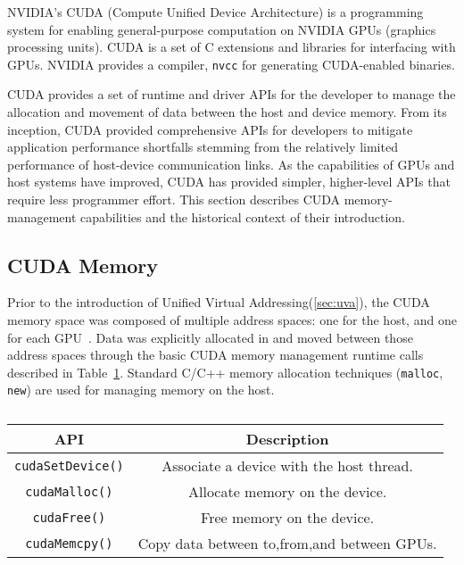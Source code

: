 NVIDIA's CUDA (Compute Unified Device Architecture) is a programming system for enabling general-purpose computation on NVIDIA GPUs (graphics processing units).
CUDA is a set of C extensions and libraries for interfacing with GPUs.
NVIDIA provides a compiler, \texttt{nvcc} for generating CUDA-enabled binaries.

CUDA provides a set of runtime and driver APIs for the developer to manage the allocation and movement of data between the host and device memory.
From its inception, CUDA provided comprehensive APIs for developers to mitigate application performance shortfalls stemming from the relatively limited performance of host-device communication links.
As the capabilities of GPUs and host systems have improved, CUDA has provided simpler, higher-level APIs that require less programmer effort.
This section describes CUDA memory-management capabilities and the historical context of their introduction.

\subsection{CUDA Memory}

Prior to the introduction of Unified Virtual Addressing(\ref{sec:uva}), the CUDA memory space was composed of multiple address spaces: one for the host, and one for each GPU~\cite{schroeder2011peer}.
Data was explicitly allocated in and moved between those address spaces through the basic CUDA memory management runtime calls described in Table~\ref{tab:cuda-basic-apis}.
Standard C/C++ memory allocation techniques (\texttt{malloc}, \texttt{new}) are used for managing memory on the host.

\begin{table}[h]
    \centering
    \caption[Basic CUDA Memory-management APIs]{}
    \label{tab:cuda-basic-apis}
    \begin{tabular}{|c|c|}
    \hline
    \textbf{API}    & \textbf{Description}                                    \\ \hline
    \texttt{cudaSetDevice()} & Associate a device with the host thread. \\ \hline
    \texttt{cudaMalloc()}    & Allocate memory on the device.                 \\ \hline
    \texttt{cudaFree()}      & Free memory on the device.                     \\ \hline
    \texttt{cudaMemcpy()}    & Copy data between to,from,and between GPUs.    \\ \hline
    \end{tabular}
\end{table}



